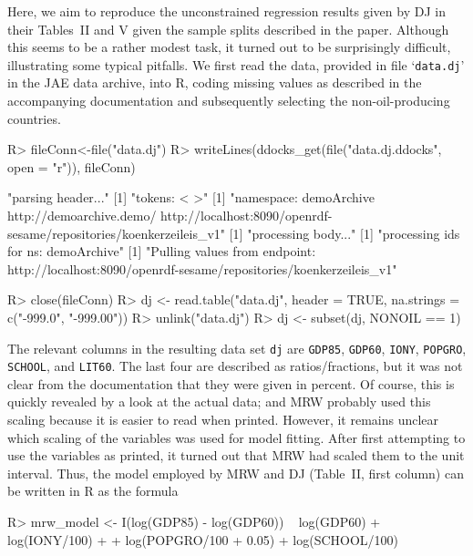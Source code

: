 \documentclass[10pt,a4paper,twoside]{article}
\let\code=\texttt
\let\proglang=\textsf
\newcommand{\file}[1]{`\code{#1}'}
\newenvironment{Schunk}{}{}
\begin{document}
Here, we aim to reproduce the unconstrained regression results given by DJ in their Tables~II and V
given the sample splits described in the paper. Although this seems to be a rather modest task, it turned
out to be surprisingly difficult, illustrating some typical pitfalls. We first read the data,
provided in file \file{data.dj} in the JAE data archive, into \proglang{R}, coding missing values
as described in the accompanying documentation and subsequently selecting the non-oil-producing
countries.
%
\begin{Schunk}
\begin{Sinput}
R> fileConn<-file("data.dj")
R> writeLines(ddocks_get(file("data.dj.ddocks", open = "r")), fileConn)
\end{Sinput}
\begin{Soutput}
[1] "parsing header..."
[1] "tokens:  < >"
[1] "namespace:  demoArchive http://demoarchive.demo/    http://localhost:8090/openrdf-sesame/repositories/koenkerzeileis_v1"
[1] "processing body..."
[1] "processing ids for ns: demoArchive"
[1] "Pulling values from endpoint: http://localhost:8090/openrdf-sesame/repositories/koenkerzeileis_v1"
\end{Soutput}
\begin{Sinput}
R> close(fileConn)
R> dj <- read.table("data.dj", header = TRUE, na.strings = c("-999.0", "-999.00"))
R> unlink("data.dj")
R> dj <- subset(dj, NONOIL == 1)
\end{Sinput}
\end{Schunk}
%
The relevant columns in the resulting data set \code{dj} are \code{GDP85},
\code{GDP60}, \code{IONY}, \code{POPGRO}, \code{SCHOOL}, and \code{LIT60}.
The last four are described as ratios/fractions, but it was not clear from the
documentation that they were given in percent. Of course, this is quickly revealed by
a look at the actual data; and MRW probably used this scaling because it is easier to
read when printed. However, it remains unclear which scaling of the variables
was used for model fitting. After first attempting to use the variables as printed, it
turned out that MRW had scaled them to the unit interval. Thus,
the model employed by MRW and DJ (Table~II, first column)
can be written in \proglang{R} as the formula
%
\begin{Schunk}
\begin{Sinput}
R> mrw_model <- I(log(GDP85) - log(GDP60)) ~ log(GDP60) + log(IONY/100) +
+    log(POPGRO/100 + 0.05) + log(SCHOOL/100)
\end{Sinput}
\end{Schunk}
\end{document}
